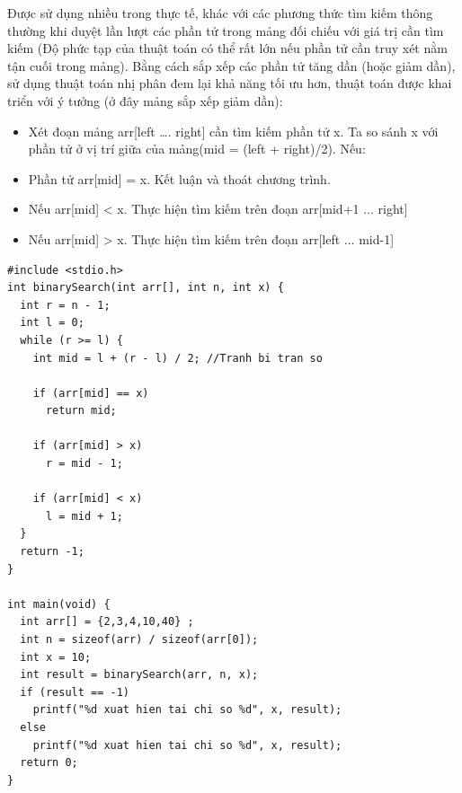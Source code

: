 \documentclass[12pt,a4paper]{article}
\begin{document}
Được sử dụng nhiều trong thực tế, khác với các phương thức tìm kiếm thông thường khi duyệt lần lượt các phần tử trong mảng đối chiếu với giá trị cần tìm kiếm (Độ phức tạp của thuật toán có thể rất lớn nếu phần tử cần truy xét nằm tận cuối trong mảng). Bằng cách sắp xếp các phần tử tăng dần (hoặc giảm dần), sử dụng thuật toán nhị phân đem lại khả năng tối ưu hơn, thuật toán được khai triển với ý tưởng (ở đây mảng sắp xếp giảm dần):\\
\begin{itemize}
	\item Xét đoạn mảng arr[left …. right] cần tìm kiếm phần tử x. Ta so sánh x với phần tử ở vị trí giữa của mảng(mid = (left + right)/2). Nếu:
	\item Phần tử arr[mid] = x. Kết luận và thoát chương trình.
	\item Nếu arr[mid] < x. Thực hiện tìm kiếm trên đoạn arr[mid+1 ... right]
	\item Nếu arr[mid] > x. Thực hiện tìm kiếm trên đoạn arr[left ... mid-1]
\end{itemize}
\begin{lstlisting}
#include <stdio.h>
int binarySearch(int arr[], int n, int x) {
  int r = n - 1; 
  int l = 0; 
  while (r >= l) {
    int mid = l + (r - l) / 2; //Tranh bi tran so 
    
    if (arr[mid] == x)
      return mid;
 
    if (arr[mid] > x)
      r = mid - 1;
    
    if (arr[mid] < x)
      l = mid + 1;
  } 
  return -1;
}
 
int main(void) {
  int arr[] = {2,3,4,10,40} ;
  int n = sizeof(arr) / sizeof(arr[0]);
  int x = 10;
  int result = binarySearch(arr, n, x);
  if (result == -1)
    printf("%d xuat hien tai chi so %d", x, result);
  else
    printf("%d xuat hien tai chi so %d", x, result);
  return 0;
}
\end{lstlisting}
\end{document}
